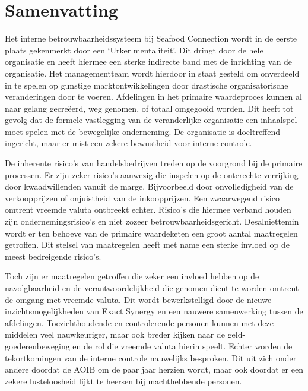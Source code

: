 \chapter*{Samenvatting} %
\thispagestyle{empty} %
\BgThispage %

Het interne betrouwbaarheidssysteem bij Seafood Connection wordt in de eerste plaats gekenmerkt door een `Urker mentaliteit'. Dit dringt door de hele organisatie en heeft hiermee een sterke indirecte band met de inrichting van de organisatie. Het managementteam wordt hierdoor in staat gesteld om onverdeeld in te spelen op gunstige marktontwikkelingen door drastische organisatorische veranderingen door te voeren. Afdelingen in het primaire waardeproces kunnen al naar gelang gecreëerd, weg genomen, of totaal omgegooid worden. Dit heeft tot gevolg dat de formele vastlegging van de veranderlijke organisatie een inhaalspel moet spelen met de bewegelijke onderneming. De organisatie is doeltreffend ingericht, maar er mist een zekere bewustheid voor interne controle. 

De inherente risico’s van handelsbedrijven treden op de voorgrond bij de primaire processen. Er zijn zeker risico's aanwezig die inspelen op de onterechte verrijking door kwaadwillenden vanuit de marge. Bijvoorbeeld door onvolledigheid van de verkoopprijzen of onjuistheid van de inkoopprijzen. Een zwaarwegend risico omtrent vreemde valuta ontbreekt echter. Risico's die hiermee verband houden zijn ondernemingsrisico's en niet zozeer betrouwbaarheidsgericht. Desalniettemin wordt er ten behoeve van de primaire waardeketen een groot aantal maatregelen getroffen. Dit stelsel van maatregelen heeft met name een sterke invloed op de meest bedreigende risico's. 

Toch zijn er maatregelen getroffen die zeker een invloed hebben op de navolgbaarheid en de verantwoordelijkheid die genomen dient te worden omtrent de omgang met vreemde valuta. Dit wordt bewerkstelligd door de nieuwe inzichtsmogelijkheden van Exact Synergy en een nauwere samenwerking tussen de afdelingen. Toezichthoudende en controlerende personen kunnen met deze middelen veel nauwkeuriger, maar ook breder kijken naar de geld-goederenbeweging en de rol die vreemde valuta hierin speelt. Echter worden de tekortkomingen van de interne controle nauwelijks besproken. Dit uit zich onder andere doordat de AOIB om de paar jaar herzien wordt, maar ook doordat er een zekere lusteloosheid lijkt te heersen bij machthebbende personen.

